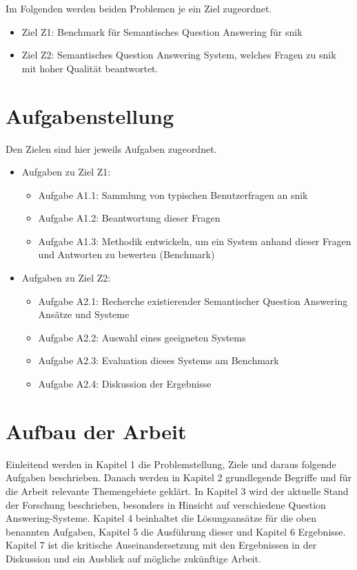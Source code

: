 Im Folgenden werden beiden Problemen je ein Ziel zugeordnet.
	\begin{itemize}
		\item Ziel Z1: Benchmark für Semantisches Question Answering für \acs{snik}
		\item Ziel Z2: Semantisches Question Answering System, welches Fragen zu \acs{snik} mit hoher Qualität beantwortet.
	\end{itemize}
\section{Aufgabenstellung}

Den Zielen sind hier jeweils Aufgaben zugeordnet.

\begin{itemize}

	\item Aufgaben zu Ziel Z1:
	\begin{itemize}
		\item Aufgabe A1.1: Sammlung von typischen Benutzerfragen an \acs{snik}
		\item Aufgabe A1.2: Beantwortung dieser Fragen
		\item Aufgabe A1.3: Methodik entwickeln, um ein System anhand dieser Fragen und Antworten zu bewerten (Benchmark)
	\end{itemize}
	\item Aufgaben zu Ziel Z2:
	\begin{itemize}
		\item Aufgabe A2.1: Recherche existierender Semantischer Question Answering Ansätze und Systeme
		\item Aufgabe A2.2: Auswahl eines geeigneten Systems
		\item Aufgabe A2.3: Evaluation dieses Systems am Benchmark
		\item Aufgabe A2.4: Diskussion der Ergebnisse
	\end{itemize}
\end{itemize}

\section{Aufbau der Arbeit}

Einleitend werden in Kapitel 1 die Problemstellung, Ziele und daraus folgende Aufgaben beschrieben.
Danach werden in Kapitel 2 grundlegende Begriffe und für die Arbeit relevante Themengebiete geklärt.
In Kapitel 3 wird der aktuelle Stand der Forschung beschrieben, besonders in Hinsicht auf verschiedene Question Answering-Systeme.
Kapitel 4 beinhaltet die Lösungsansätze für die oben benannten Aufgaben, Kapitel 5 die Ausführung dieser und Kapitel 6 Ergebnisse.
Kapitel 7 ist die kritische Auseinandersetzung mit den Ergebnissen in der Diskussion und ein Ausblick auf mögliche zukünftige Arbeit.
